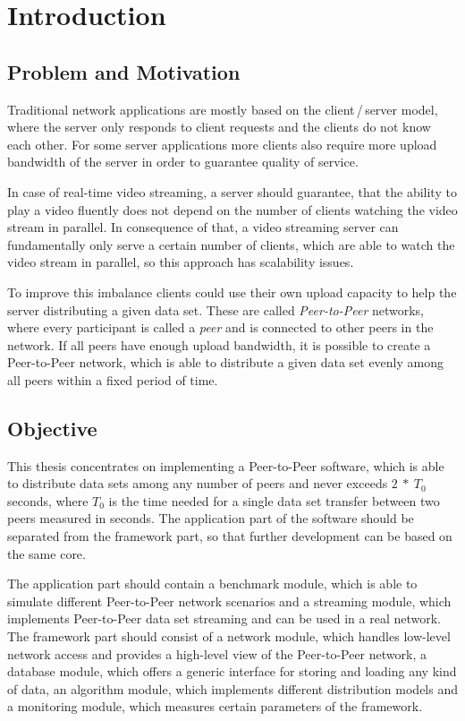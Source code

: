 
\chapter{Introduction}
\section{Problem and Motivation}
Traditional network applications are mostly based on the client\,/\,server model, where the server only responds to client requests and the clients do not know each other. For some server applications more clients also require more upload bandwidth of the server in order to guarantee quality of service.

In case of real-time video streaming, a server should guarantee, that the ability to play a video fluently does not depend on the number of clients watching the video stream in parallel. In consequence of that, a video streaming server can fundamentally only serve a certain number of clients, which are able to watch the video stream in parallel, so this approach has scalability issues.

To improve this imbalance clients could use their own upload capacity to help the server distributing a given data set. These are called \emph{Peer-to-Peer} networks, where every participant is called a \emph{peer} and is connected to other peers in the network.  If all peers have enough upload bandwidth, it is possible to create a Peer-to-Peer network, which is able to distribute a given data set evenly among all peers within a fixed period of time.
\vfill

\section{Objective}
This thesis concentrates on implementing a Peer-to-Peer software, which is able to distribute data sets among any number of peers and never exceeds $2\:*\:T_0$ seconds, where $T_0$ is the time needed for a single data set transfer between two peers measured in seconds. The application part of the software should be separated from the framework part, so that further development can be based on the same core.

The application part should contain a benchmark module, which is able to simulate different Peer-to-Peer network scenarios and a streaming module, which implements Peer-to-Peer data set streaming and can be used in a real network. The framework part should consist of a network module, which handles low-level network access and provides a high-level view of the Peer-to-Peer network, a database module, which offers a generic interface for storing and loading any kind of data, an algorithm module, which implements different distribution models and a monitoring module, which measures certain parameters of the framework.

